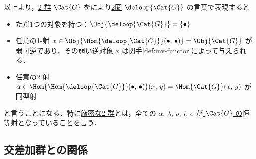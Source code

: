 \documentclass[TQFT_main]{subfiles}
\begin{document}
以上より，\hyperref[def:W2G-C2G]{2-群} $\Cat{G}$ をにより\hyperref[def:2cat]{2圏} $\deloop{\Cat{G}}$ の言葉で表現すると
\begin{itemize}
    \item ただ1つの対象を持つ：$\Obj{\deloop{\Cat{G}}} = \{\bullet\}$
    \item 任意の1-射 $x \in \Obj{\Hom{\deloop{\Cat{G}}} (\bullet,\, \bullet)} = \Obj{\Cat{G}}$ が\hyperref[def:weak-inverse]{弱可逆}であり，その\hyperref[def:weak-inverse]{弱い逆対象} $\bar{x}$ は関手\eqref{def:inv-functor}によって与えられる．
    \item 任意の2-射 $\alpha \in \Hom{\Hom{\deloop{\Cat{G}}}(\bullet,\, \bullet)} (x,\, y) = \Hom{\Cat{G}} (x,\, y)$ が同型射
\end{itemize}
と言うことになる．特に\hyperref[def:W2G-C2G]{厳密な2-群}とは，全ての $\alpha,\, \lambda,\, \rho,\, i,\, e$ が\underline{ $\Cat{G}$ の}恒等射となっていることを言う．

\subsection{交差加群との関係}
\end{document}
